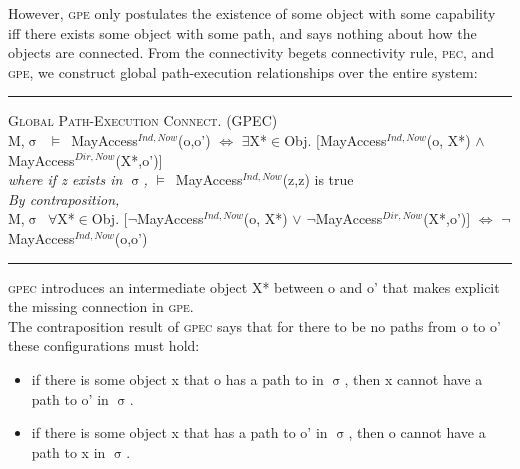 \documentclass[a4paper,11pt, twoside,twocolumn]{article}
\newenvironment{logic}[1][]
{\begin{flushleft} \small }
{\end{flushleft}}
\newcommand{\loin}{$\in$}
\newcommand{\loforall}{$\forall$}
\newcommand{\loexists}{$\exists$}
\newcommand{\loand}{$\land$}
\newcommand{\loor} {$\lor$}
\newcommand{\losigma}{$\upsigma$}
\newcommand{\loturns} {$\vDash$}
\newcommand{\loiff} {$\iff$}
\newcommand{\loneg}{$\boldsymbol \neg$}
\newcommand{\ablock} {\null\qquad}
\begin{document}
However, \textsc{gpe} only postulates the existence of some object with some capability iff there exists some object with some path, and says nothing about how the objects are connected. From the connectivity begets connectivity rule, \textsc{pec}, and \textsc{gpe}, we construct global path-execution relationships over the entire system:
\begin{logic}
\hrule\null
\textsc{\normalsize *Global Path-Execution Connect. (GPEC)}\\
M,\losigma\ \loturns\ MayAccess$^{Ind,Now}$(o,o')\linebreak
\ablock \loiff\linebreak
\ablock \loexists X*\loin{Obj}. $[$MayAccess$^{Ind,Now}$(o, X*) \loand\linebreak
\ablock \ablock \ablock \quad MayAccess$^{Dir,Now}$(X*,o')$]$
\\
\ablock \textit{where if z exists in \losigma,} \linebreak
\ablock \loturns\ MayAccess$^{Ind,Now}$(z,z) is true \linebreak
\\
\textit{By contraposition,} \\
M,\losigma\ \loforall X*\loin{Obj}. $[$\loneg MayAccess$^{Ind,Now}$(o, X*) \loor\linebreak
\ablock \ablock \ablock \quad \loneg MayAccess$^{Dir,Now}$(X*,o')$]$\linebreak
\ablock \loiff\linebreak
\ablock \loneg MayAccess$^{Ind,Now}$(o,o')

\hrule
\end{logic}
\textsc{gpec} introduces an intermediate object X* between o and o' that makes explicit the missing connection in \textsc{gpe}.\\

The contraposition result of \textsc{gpec} says that for there to be no paths from o to o' these configurations must hold:
\begin{itemize}\setlength\itemsep{0.5em}
\item if there is some object x that o has a path to in \losigma, then x cannot have a path to o' in \losigma.
\item if there is some object x that has a path to o' in \losigma, then o cannot have a path to x in \losigma.
\end{itemize}
\end{document}
